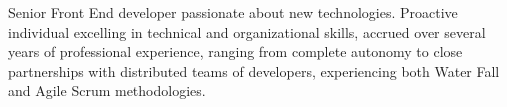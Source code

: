 

\begin{cvparagraph}

Senior Front End developer passionate about new technologies. Proactive individual excelling in technical and organizational skills, accrued over several years of professional experience, ranging from complete autonomy to close partnerships with distributed teams of developers, experiencing both Water Fall and Agile Scrum methodologies.
\end{cvparagraph}
